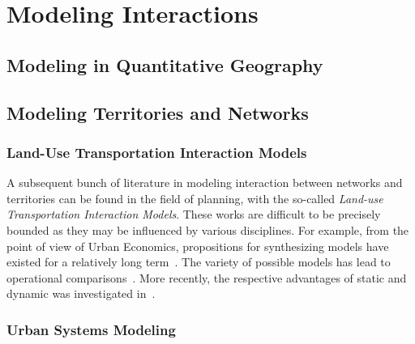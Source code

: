 \section{Modeling Interactions}


\subsection{Modeling in Quantitative Geography}





\subsection{Modeling Territories and Networks}


\subsubsection{Land-Use Transportation Interaction Models}

A subsequent bunch of literature in modeling interaction between networks and territories can be found in the field of planning, with the so-called \emph{Land-use Transportation Interaction Models}. These works are difficult to be precisely bounded as they may be influenced by various disciplines. For example, from the point of view of Urban Economics, propositions for synthesizing models have existed for a relatively long term~\cite{putman1975urban}. The variety of possible models has lead to operational comparisons~\cite{paulley1991overview,wegener1991one}. More recently, the respective advantages of static and dynamic was investigated in~\cite{kryvobokov2013comparison}.

\cite{chang2006models}

\cite{delons:hal-00319087}

\cite{iacono2008models}

\cite{wegener2004land}


\subsubsection{Urban Systems Modeling}



